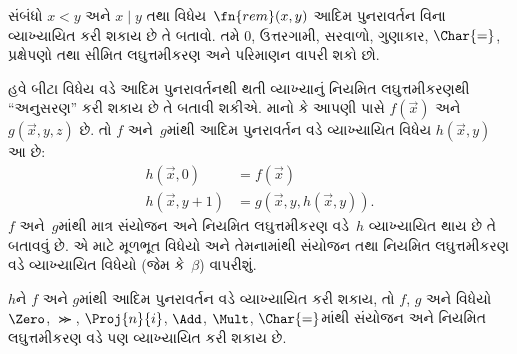 \begin{prob}
  સંબંધો $x < y$ અને $x \mid y$
  તથા વિધેય~$\fn{rem}(x,y)$
  આદિમ પુનરાવર્તન વિના
  વ્યાખ્યાયિત કરી શકાય છે તે
  બતાવો. તમે $0$, ઉત્તરગામી,
  સરવાળો, ગુણાકાર, $\Char{=}$,
  પ્રક્ષેપણો તથા સીમિત
  લઘુત્તમીકરણ અને પરિમાણન
  વાપરી શકો છો.
\end{prob}
\endgroup


\begingroup
\makeatletter{}\makeatother

\label{guunit:OLP-0293}


હવે બીટા વિધેય વડે આદિમ
પુનરાવર્તનથી થતી વ્યાખ્યાનું
નિયમિત લઘુત્તમીકરણથી ``અનુસરણ''
કરી શકાય છે તે બતાવી શકીએ.
માનો કે આપણી પાસે $f(\vec x)$
અને $g(\vec x, y, z)$ છે.
તો $f$ અને~$g$માંથી આદિમ
પુનરાવર્તન વડે વ્યાખ્યાયિત વિધેય
$h(\vec x,y)$ આ છે:
\begin{align*}
h(\vec x, 0) & =  f(\vec x) \\
h(\vec x, y+1) & =  g(\vec x, y, h(\vec x, y)).
\end{align*}
$f$ અને~$g$માંથી માત્ર સંયોજન
અને નિયમિત લઘુત્તમીકરણ વડે~$h$
વ્યાખ્યાયિત થાય છે તે બતાવવું છે.
એ માટે મૂળભૂત વિધેયો અને
તેમનામાંથી સંયોજન તથા નિયમિત
લઘુત્તમીકરણ વડે વ્યાખ્યાયિત
વિધેયો (જેમ કે~$\beta$) વાપરીશું.

\begin{lem}
$h$ને $f$ અને $g$માંથી આદિમ
પુનરાવર્તન વડે વ્યાખ્યાયિત
કરી શકાય, તો $f$, $g$ અને
વિધેયો $\Zero$, $\Succ$,
$\Proj{n}{i}$, $\Add$, $\Mult$,
$\Char{=}$માંથી સંયોજન અને
નિયમિત લઘુત્તમીકરણ વડે પણ
વ્યાખ્યાયિત કરી શકાય છે.
\end{lem}

